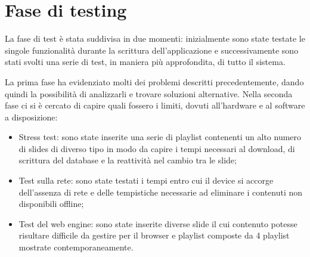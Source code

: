 \section{Fase di testing}

La fase di test è stata suddivisa in due momenti: inizialmente sono state testate le singole funzionalità durante la scrittura dell'applicazione e successivamente sono stati svolti una serie di test, in maniera più approfondita, di tutto il sistema.

La prima fase ha evidenziato molti dei problemi descritti precedentemente, dando quindi la possibilità di analizzarli e trovare soluzioni alternative.
Nella seconda fase ci si è cercato di capire quali fossero i limiti, dovuti all'hardware e al software a disposizione:
\begin{itemize}
    \item Stress test: sono state inserite una serie di playlist contenenti un alto numero di slides di diverso tipo in modo da capire i tempi necessari al download, di scrittura del database e la reattività nel cambio tra le slide;
    \item Test sulla rete: sono state testati i tempi entro cui il device si accorge dell'assenza di rete e delle tempistiche necessarie ad eliminare i contenuti non disponibili offline;
    \item Test del web engine: sono state inserite diverse slide il cui contenuto potesse risultare difficile da gestire per il browser e playlist composte da 4 playlist mostrate contemporaneamente.
\end{itemize}


